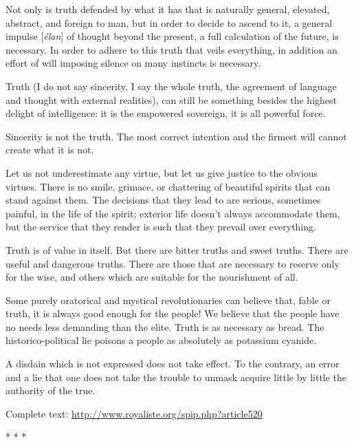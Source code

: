Not only is truth defended by what it has that is naturally general, elevated, abstract, and foreign to man, but in order to decide to ascend to it, a general impulse [\emph{élan}] of thought beyond the present, a full calculation of the future, is necessary. In order to adhere to this truth that veils everything, in addition an effort of will imposing silence on many instincts is necessary.

Truth (I do not say sincerity, I say the whole truth, the agreement of language and thought with external realities), can still be something besides the highest delight of intelligence: it is the empowered sovereign, it is all powerful force.

Sincerity is not the truth. The most correct intention and the firmest will cannot create what it is not.

Let us not underestimate any virtue, but let us give justice to the obvious virtues. There is no smile, grimace, or chattering of beautiful spirits that can stand against them. The decisions that they lead to are serious, sometimes painful, in the life of the spirit; exterior life doesn't always accommodate them, but the service that they render is such that they prevail over everything.

Truth is of value in itself. But there are bitter truths and sweet truths. There are useful and dangerous truths. There are those that are necessary to reserve only for the wise, and others which are suitable for the nourishment of all.

Some purely oratorical and mystical revolutionaries can believe that, fable or truth, it is always good enough for the people! We believe that the people have no needs less demanding than the elite. Truth is as necessary as bread. The historico-political lie poisons a people as absolutely as potassium cyanide.

A disdain which is not expressed does not take effect. To the contrary, an error and a lie that one does not take the trouble to unmask acquire little by little the authority of the true.

Complete text: \url{http://www.royaliste.org/spip.php?article520}




\begin{center}* * *\end{center}

